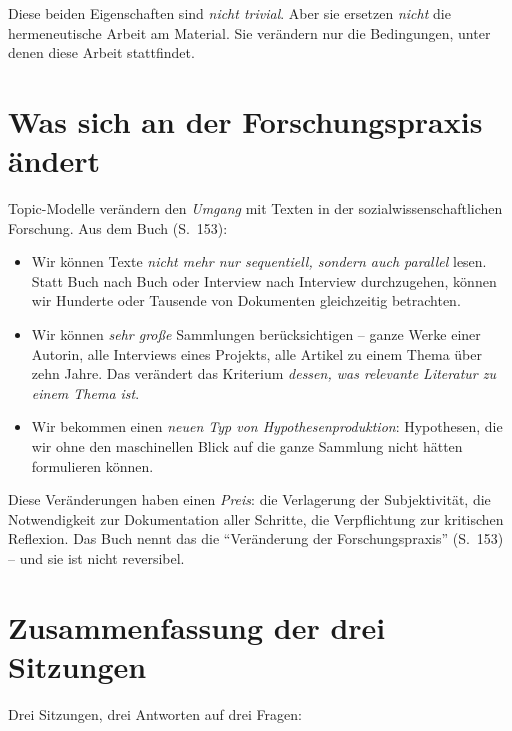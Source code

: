 \documentclass[a4paper,11pt]{article}
\begin{document}
Diese beiden Eigenschaften sind \emph{nicht trivial}. Aber sie ersetzen
\emph{nicht} die hermeneutische Arbeit am Material. Sie verändern nur
die Bedingungen, unter denen diese Arbeit stattfindet.

\section{Was sich an der Forschungspraxis ändert}

Topic-Modelle verändern den \emph{Umgang} mit Texten in der
sozialwissenschaftlichen Forschung. Aus dem Buch (S.~153):

\begin{itemize}
\item Wir können Texte \emph{nicht mehr nur sequentiell, sondern auch
parallel} lesen. Statt Buch nach Buch oder Interview nach Interview
durchzugehen, können wir Hunderte oder Tausende von Dokumenten
gleichzeitig betrachten.

\item Wir können \emph{sehr große} Sammlungen berücksichtigen --
ganze Werke einer Autorin, alle Interviews eines Projekts, alle
Artikel zu einem Thema über zehn Jahre. Das verändert das Kriterium
\emph{dessen, was relevante Literatur zu einem Thema ist}.

\item Wir bekommen einen \emph{neuen Typ von Hypothesenproduktion}:
Hypothesen, die wir ohne den maschinellen Blick auf die ganze
Sammlung nicht hätten formulieren können.
\end{itemize}

Diese Veränderungen haben einen \emph{Preis}: die Verlagerung der
Subjektivität, die Notwendigkeit zur Dokumentation aller Schritte,
die Verpflichtung zur kritischen Reflexion. Das Buch nennt das die
\enquote{Veränderung der Forschungspraxis} (S.~153) -- und sie ist
nicht reversibel.

\section{Zusammenfassung der drei Sitzungen}

Drei Sitzungen, drei Antworten auf drei Fragen:
\end{document}
